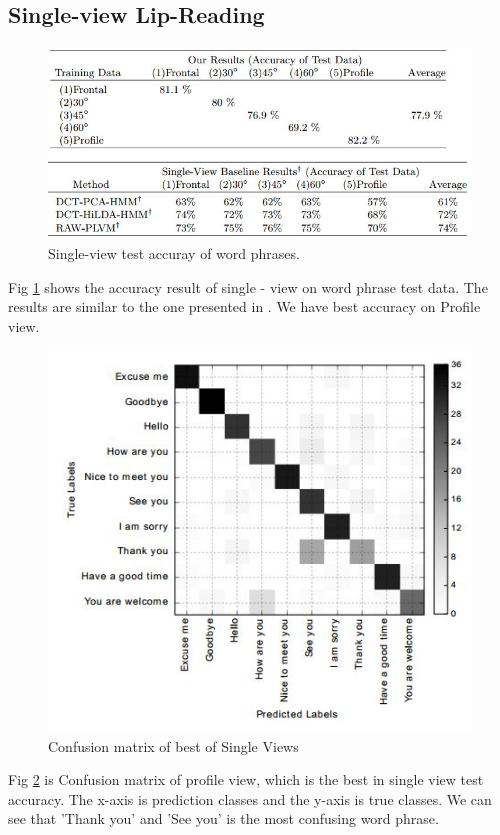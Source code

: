 \subsection{Single-view Lip-Reading}

\begin{figure}[h]
	\centering
	\includegraphics[width=\columnwidth]{fig/s1.jpg}
	\caption{Single-view test accuray of word phrases.}
	\label{fig:s1}
\end{figure}
Fig \ref{fig:s1} shows the accuracy result of single - view on word phrase test data. The results are similar to the one presented in \cite{Lee}. We have best accuracy on Profile view.

\begin{figure}[h]
	\centering
	\includegraphics[width=\columnwidth]{fig/s2.jpg}
	\caption{Confusion matrix of best of Single Views}
	\label{fig:s2}
\end{figure}
Fig \ref{fig:s2} is Confusion matrix of profile view, which is the best in single view test accuracy. The x-axis is prediction classes and the y-axis is true classes.
We can see that 'Thank you' and 'See you' is the most confusing word phrase.


